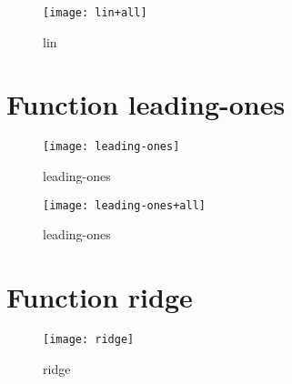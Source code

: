 \begin{figure}[h]
\begin{center}
\texttt{[image: lin+all]}
\caption{lin}
\end{center}
\end{figure}

\newpage

\section{Function leading-ones}

\begin{center}

\end{center}

\begin{center}

\end{center}

\begin{figure}[h]
\begin{center}
\texttt{[image: leading-ones]}
\caption{leading-ones}
\end{center}
\end{figure}

\begin{figure}[h]
\begin{center}
\texttt{[image: leading-ones+all]}
\caption{leading-ones}
\end{center}
\end{figure}

\newpage

\section{Function ridge}

\begin{center}

\end{center}

\begin{center}

\end{center}

\begin{figure}[h]
\begin{center}
\texttt{[image: ridge]}
\caption{ridge}
\end{center}
\end{figure}

